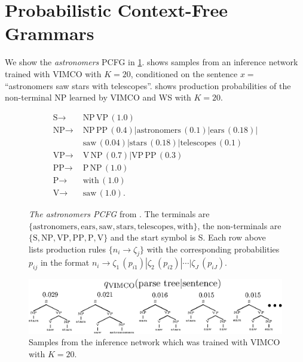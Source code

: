 
\section{Probabilistic Context-Free Grammars}
\label{app:pcfg}

We show the \emph{astronomers} \gls{PCFG} in \cref{fig:app/pcfg/astronomers}.
 shows samples from an inference network trained with \gls{VIMCO} with $K = 20$, conditioned on the sentence $x = $ ``astronomers saw stars with telescopes''.
 shows production probabilities of the non-terminal NP learned by \gls{VIMCO} and \gls{WS} with $K = 20$.
\begin{figure}[htb]
  \begin{align*}
    \text{S} \to&\,\, \text{NP}\,\text{VP}\,(1.0) \\
    \text{NP} \to&\,\, \text{NP}\,\text{PP}\,(0.4) | \text{astronomers}\,(0.1) | \text{ears}\,(0.18) | \\
    &\,\, \text{saw}\,(0.04) | \text{stars}\,(0.18) | \text{telescopes}\,(0.1) \\
    \text{VP} \to&\,\, \text{V}\,\text{NP}\,(0.7) | \text{VP}\,\text{PP}\,(0.3) \\
    \text{PP} \to&\,\, \text{P}\,\text{NP}\,(1.0) \\
    \text{P} \to&\,\, \text{with}\,(1.0) \\
    \text{V} \to&\,\, \text{saw}\,(1.0).
  \end{align*}
  \caption{\emph{The astronomers \acrshort{PCFG}} from \citet[Table 11.2]{manning1999foundations}. The terminals are $\{\text{astronomers}, \text{ears}, \text{saw}, \text{stars}, \text{telescopes}, \text{with}\}$, the non-terminals are $\{\text{S}, \text{NP}, \text{VP}, \text{PP}, \text{P}, \text{V}\}$ and the start symbol is S.
  Each row above lists production rules $\{n_i \to \zeta_j\}$ with the corresponding probabilities $p_{ij}$ in the format $n_i \to \zeta_1\,(p_{i1}) | \zeta_2\,(p_{i2}) | \cdots | \zeta_J\,(p_{iJ})$.}
  \label{fig:app/pcfg/astronomers}
\end{figure}
\begin{figure}[htb]
  \includegraphics[scale=0.6]{figures/RRWS/pcfg/vimco_q_samples.eps}
  \caption{Samples from the inference network which was trained with \gls{VIMCO} with $K = 20$.}
  \label{fig:experiments/pcfg/vimco_q_samples}
  \vspace*{-2ex}
\end{figure}
